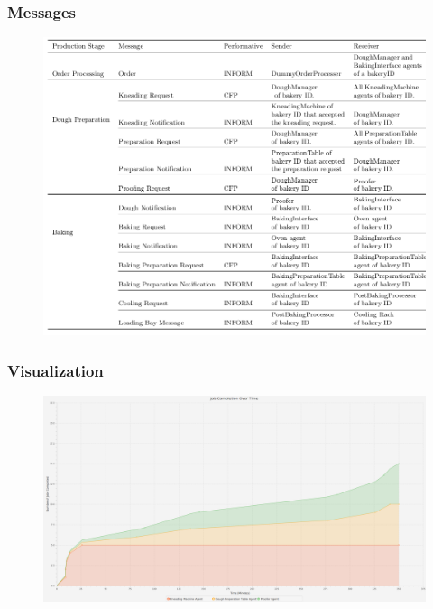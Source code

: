 \documentclass{beamer}
\begin{document}
		\begin{frame}
			\frametitle{Messages}
			
			\begin{figure}\vspace{-1cm}
				\includegraphics[scale=0.29]{images/messages.png}
			\end{figure}
		\end{frame}
		
		\begin{frame}
			\frametitle{Visualization}
			
			\begin{figure}\vspace{-1cm}
				\includegraphics[scale=0.17`]{images/visualization.png}
			\end{figure}
		\end{frame}
		
		
\end{document}
